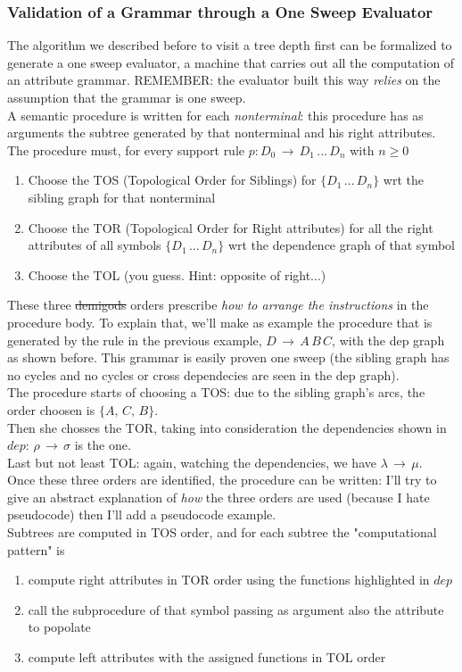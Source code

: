 			\subsubsection{Validation of a Grammar through a One Sweep Evaluator}
				The algorithm we described before to visit a tree depth first can be formalized to generate a one sweep evaluator, a machine that carries out all the computation of an attribute grammar. REMEMBER: the evaluator built this way \emph{relies} on the assumption that the grammar is one sweep.\\
				A semantic procedure is written for each \emph{nonterminal}: this procedure has as arguments the subtree generated by that nonterminal and his right attributes. The procedure must, for every support rule $p: D_0 \,\rightarrow\, D_1\,...\,D_n$ with $n \geq 0$
				\begin{enumerate}
					\item Choose the TOS (Topological Order for Siblings) for $\{D_1\,...\,D_n\}$ wrt the sibling graph for that nonterminal
					\item Choose the TOR (Topological Order for Right attributes) for all the right attributes of all symbols $\{D_1\,...\,D_n\}$ wrt the dependence graph of that symbol
					\item Choose the TOL (you guess. Hint: opposite of right...)
				\end{enumerate}
				These three \st{demigods} orders prescribe \emph{how to arrange the instructions} in the procedure body. To explain that, we'll make as example the procedure that is generated by the rule in the previous example, $D \,\rightarrow\, A\,B\,C$, with the dep graph as shown before. This grammar is easily proven one sweep (the sibling graph has no cycles and no cycles or cross dependecies are seen in the dep graph).\\
				The procedure starts of choosing a TOS: due to the sibling graph's arcs, the order choosen is $\{A,\,C,\,B\}$.\\
				Then she chosses the TOR, taking into consideration the dependencies shown in $dep$: $\rho\,\rightarrow\,\sigma$ is the one.\\
				Last but not least TOL: again, watching the dependencies, we have $\lambda\,\rightarrow\,\mu$.\\
				Once these three orders are identified, the procedure can be written: I'll try to give an abstract explanation of \emph{how} the three orders are used (because I hate pseudocode) then I'll add a pseudocode example.\\
				Subtrees are computed in TOS order, and for each subtree the "computational pattern" is
				\begin{enumerate}
					\item compute right attributes in TOR order using the functions highlighted in $dep$
					\item call the subprocedure of that symbol passing as argument also the attribute to popolate
					\item compute left attributes with the assigned functions in TOL order
				\end{enumerate}
				
